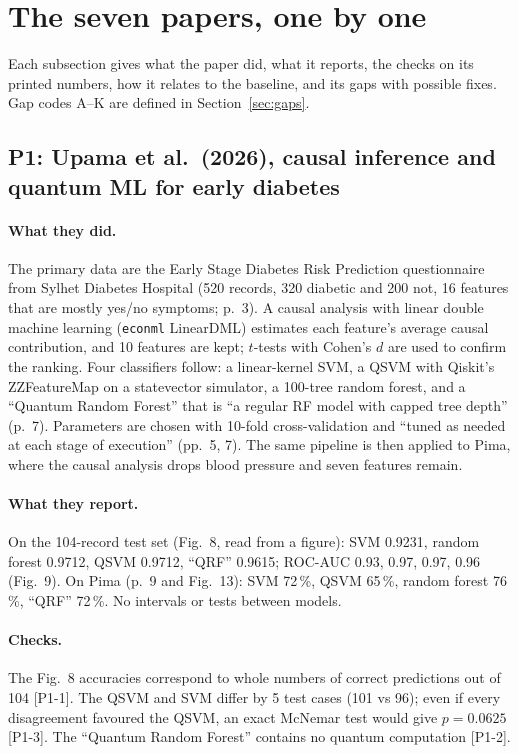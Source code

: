 \documentclass[11pt,a4paper]{article}
\newcommand{\code}[1]{\texttt{\small #1}}
\newcommand{\chk}[1]{\textsf{\small [#1]}}
\begin{document}
\section{The seven papers, one by one}
\label{sec:papers}
Each subsection gives what the paper did, what it reports, the checks on its printed numbers, how it relates to the baseline, and its gaps with possible fixes. Gap codes A--K are defined in Section~\ref{sec:gaps}.

\subsection{P1: Upama et al.\ (2026), causal inference and quantum ML for early diabetes}
\label{sec:p1}
\paragraph{What they did.} The primary data are the Early Stage Diabetes Risk Prediction questionnaire from Sylhet Diabetes Hospital (520 records, 320 diabetic and 200 not, 16 features that are mostly yes/no symptoms; p.~3). A causal analysis with linear double machine learning (\code{econml} LinearDML) estimates each feature's average causal contribution, and 10 features are kept; $t$-tests with Cohen's $d$ are used to confirm the ranking. Four classifiers follow: a linear-kernel SVM, a QSVM with Qiskit's ZZFeatureMap on a statevector simulator, a 100-tree random forest, and a ``Quantum Random Forest'' that is ``a regular RF model with capped tree depth'' (p.~7). Parameters are chosen with 10-fold cross-validation and ``tuned as needed at each stage of execution'' (pp.~5, 7). The same pipeline is then applied to Pima, where the causal analysis drops blood pressure and seven features remain.

\paragraph{What they report.} On the 104-record test set (Fig.~8, read from a figure): SVM 0.9231, random forest 0.9712, QSVM 0.9712, ``QRF'' 0.9615; ROC-AUC 0.93, 0.97, 0.97, 0.96 (Fig.~9). On Pima (p.~9 and Fig.~13): SVM 72\,\%, QSVM 65\,\%, random forest 76\,\%, ``QRF'' 72\,\%. No intervals or tests between models.

\paragraph{Checks.} The Fig.~8 accuracies correspond to whole numbers of correct predictions out of 104 \chk{P1-1}. The QSVM and SVM differ by 5 test cases (101 vs 96); even if every disagreement favoured the QSVM, an exact McNemar test would give $p=0.0625$ \chk{P1-3}. The ``Quantum Random Forest'' contains no quantum computation \chk{P1-2}.
\end{document}
